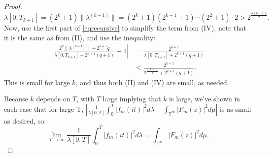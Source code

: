 \documentclass[]{elsarticle}
\newcommand{\T}{\mathbb{T}}
\numberwithin{equation}{section}
\begin{document}
\begin{proof}
\begin{equation}
        \lambda[0,T_{k+1}] = (2^k+1)\|\lambda^{(k-1)}\| = (2^k+1)(2^{k-1}+1)\cdots(2^2+1)\cdot 2> 2^{\frac{k(k+1)}{2}}.
      \end{equation}
      Now, use the first part of \eqref{eqrecursive} to simplify the term from (IV), note that it is the same as from (II), and use the inequality:
      \begin{align*}
        \left|\frac{2^k\|\lambda^{(k-1)}\|+2^{k+1}q}{\lambda[0,T_{k+1}]+2^{k+1}(q+1)}-1\right|
          &= \frac{2^{k+1}}{\lambda[0,T_{k+1}]+2^{k+1}(q+1)}\\
          &< \frac{2^{k+1}}{2^{\frac{k(k+1)}{2}}+2^{k+1}(q+1)}.
      \end{align*}
      This is small for large $k$, and thus both (II) and (IV) are small, as needed.

      Because $k$ depends on $T$, with $T$ large implying that $k$ is large, we've shown in each case that for large T, $\left|\frac{1}{\lambda[0,T]} \int_{0}^{T} |f_m(it)|^2 d\lambda-\int_{\T^{\infty}}|F_m(z)|^2d\mu\right|$ is as small as desired, so:
        $$\lim\limits_{T\to\infty}\frac{1}{\lambda[0,T]} \int_{0}^{T} |f_m(it)|^2 d\lambda = \int_{\T^{\infty}}|F_m(z)|^2d\mu. $$
    \end{proof}
\end{document}
